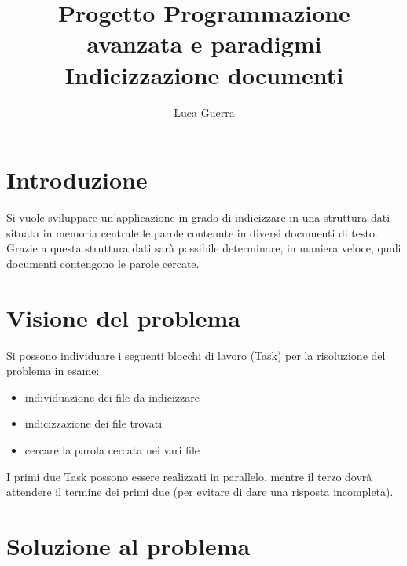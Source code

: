 \documentclass{article}
\begin{document}
\title{Progetto Programmazione avanzata e paradigmi \\ Indicizzazione documenti}

\author{Luca Guerra}

\maketitle

\section{Introduzione}
Si vuole sviluppare un'applicazione in grado di indicizzare in una struttura dati situata in memoria centrale le parole contenute in diversi documenti di testo. Grazie a questa struttura dati sarà possibile determinare, in maniera veloce, quali documenti contengono le parole cercate.

\section{Visione del problema}
Si possono individuare i seguenti blocchi di lavoro (Task) per la risoluzione del problema in esame:
\begin{itemize}
  \item individuazione dei file da indicizzare
  \item indicizzazione dei file trovati
  \item cercare la parola cercata nei vari file
\end{itemize} 
I primi due Task possono essere realizzati in parallelo, mentre il terzo dovrà attendere il termine dei primi due (per evitare di dare una risposta incompleta).

\section{Soluzione al problema}
\end{document}
